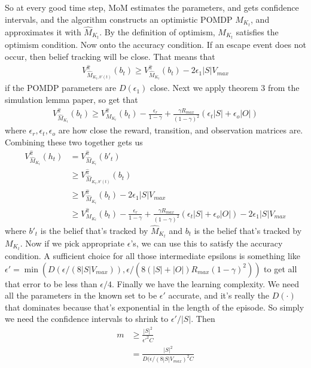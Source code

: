 \documentclass[10pt,english]{article}
\begin{document}
So at every good time step, MoM estimates the parameters, and gets confidence intervals, and the algorithm constructs an optimistic POMDP $M_{K_t}$, and approximates it with $\widehat{M}_{K_t}$. By the definition of optimism, $M_{K_t}$ satisfies the optimism condition. Now onto the accuracy condition. If an escape event does not occur, then belief tracking will be close. That means that
\begin{align}
V^{\widehat{\pi}}_{\widehat{M}_{K_t,b'(t)}}(b_t) \geq V^{\widehat{\pi}}_{\widehat{M}_{K_t}}(b_t) - 2\epsilon_1|S|V_{max}
\end{align}
if the POMDP parameters are $D(\epsilon_1)$ close. Next we apply theorem 3 from the simulation lemma paper, so get that
\begin{align}
V^{\widehat{\pi}}_{\widehat{M}_{K_t}}(b_t) \geq V^{\widehat{\pi}}_{M_{K_t}}(b_t) - \frac{\epsilon_r}{1-\gamma} + \frac{\gamma R_{max}}{(1-\gamma)^2}(\epsilon_t|S| + \epsilon_o |O|)
\end{align}
where $\epsilon_r,\epsilon_t,\epsilon_o$ are how close the reward, transition, and observation matrices are. Combining these two together gets us
\begin{align}
V^{\widehat{\pi}}_{\widehat{M}_{K_t}}(h_t) &= V^{\widehat{\pi}}_{\widehat{M}_{K_t}}(b'_t) \\
 &\geq V^{\widehat{\pi}}_{\widehat{M}_{K_t,b'(t)}}(b_t) \\
 &\geq V^{\widehat{\pi}}_{\widehat{M}_{K_t}}(b_t) - 2\epsilon_1|S|V_{max} \\
  &\geq V^{\widehat{\pi}}_{M_{K_t}}(b_t) - \frac{\epsilon_r}{1-\gamma} + \frac{\gamma R_{max}}{(1-\gamma)^2}(\epsilon_t|S| + \epsilon_o |O|) - 2\epsilon_1|S|V_{max}
\end{align}
where $b'_t$ is the belief that's tracked by $\widehat{M}_{K_t}$ and $b_t$ is the belief that's tracked by $M_{K_t}$. Now if we pick appropriate $\epsilon$'s, we can use this to satisfy the accuracy condition. A sufficient choice for all those intermediate epsilons is something like $\epsilon' = \min(D(\epsilon/(8|S|V_{max})),\epsilon/(8(|S|+|O|)R_{max}(1-\gamma)^2))$ to get all that error to be less than $\epsilon/4$. Finally we have the learning complexity. We need all the parameters in the known set to be $\epsilon'$ accurate, and it's really the $D(\cdot)$ that dominates because that's exponential in the length of the episode. So simply we need the confidence intervals to shrink to $\epsilon'/|S|$. Then
\begin{align}
m &\geq \frac{|S|^2}{\epsilon'^2 C} \\
&=\frac{|S|^2}{D(\epsilon/(8|S|V_{max})^2 C}
\end{align}
\end{document}
